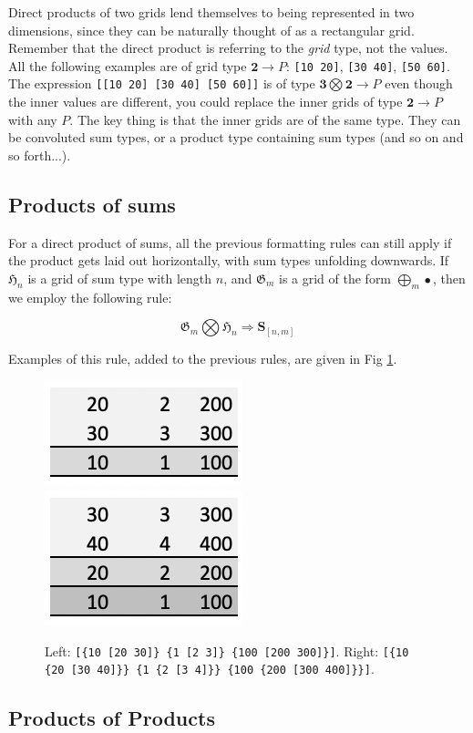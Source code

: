 \documentclass[11pt]{article}
\newcommand{\gr}[1]{\mathfrak{#1}}
\newcommand{\unit}{\bullet}
\newcommand{\two}{\mathbf{2}}
\newcommand{\three}{\mathbf{3}}
\begin{document}
Direct products of two grids lend themselves to being represented in two dimensions, since they can be naturally thought of as a rectangular grid. Remember that the direct product is referring to the \textit{grid} type, not the values. All the following examples are of grid type $\two \to P$: \verb|[10 20]|,  \verb|[30 40]|,  \verb|[50 60]|. The expression  \verb|[[10 20] [30 40] [50 60]]| is of type $\three \bigotimes \two \to P$ even though the inner values are different, you could replace the inner grids of type $\two \to P$ with any $P$. The key thing is that the inner grids are of the same type. They can be convoluted sum types, or a product type containing sum types (and so on and so forth...). 

\subsection{Products of sums}

For a direct product of sums, all the previous formatting rules can still apply if the product gets laid out horizontally, with sum types unfolding downwards. If $\gr{H}_n$ is a grid of sum type with length $n$, and $\gr{G}_m$ is a grid of the form $\bigoplus_m \unit$, then we employ the following rule:

\begin{equation} 
 \gr{G}_m \bigotimes \gr{H}_n \Rightarrow \mathbf{S}_{[n,m]} \label{eq:rule4}
\end{equation}

Examples of this rule, added to the previous rules, are given in Fig \ref{fig:format2}. 

\begin{figure}[h] 
\centering
  \includegraphics[scale=.7]{screenshots/prod1.png}
    \includegraphics[scale=.7]{screenshots/prod2.png}
  \caption{Left: \texttt{[\{10 [20 30]\} \{1 [2 3]\} \{100 [200 300]\}]}. Right:  \texttt{[\{10 \{20 [30 40]\}\} \{1 \{2 [3 4]\}\} \{100 \{200 [300 400]\}\}]}.}
  \label{fig:format2}
\end{figure}

\subsection{Products of Products}
\end{document}
